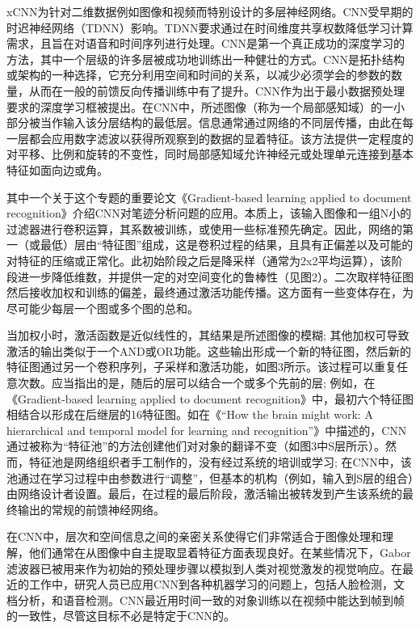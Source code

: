 xCNN为针对二维数据例如图像和视频而特别设计的多层神经网络。CNN受早期的时迟神经网络（TDNN）影响。TDNN要求通过在时间维度共享权数降低学习计算需求，且旨在对语音和时间序列进行处理。CNN是第一个真正成功的深度学习的方法，其中一个层级的许多层被成功地训练出一种健壮的方式。CNN是拓扑结构或架构的一种选择，它充分利用空间和时间的关系，以减少必须学会的参数的数量，从而在一般的前馈反向传播训练中有了提升。CNN作为出于最小数据预处理要求的深度学习框被提出。在CNN中，所述图像（称为一个局部感知域）的一小部分被当作输入该分层结构的最低层。信息通常通过网络的不同层传播，由此在每一层都会应用数字滤波以获得所观察到的数据的显着特征。该方法提供一定程度的对平移、比例和旋转的不变性，同时局部感知域允许神经元或处理单元连接到基本特征如面向边或角。

其中一个关于这个专题的重要论文《Gradient-based learning applied to document recognition》介绍CNN对笔迹分析问题的应用。本质上，该输入图像和一组N小的过滤器进行卷积运算，其系数被训练，或使用一些标准预先确定。因此，网络的第一（或最低）层由“特征图”组成，这是卷积过程的结果，且具有正偏差以及可能的对特征的压缩或正常化。此初始阶段之后是降采样（通常为2x2平均运算），该阶段进一步降低维数，并提供一定的对空间变化的鲁棒性（见图2）。二次取样特征图然后接收加权和训练的偏差，最终通过激活功能传播。这方面有一些变体存在，为尽可能少每层一个图或多个图的总和。

当加权小时，激活函数是近似线性的，其结果是所述图像的模糊; 其他加权可导致激活的输出类似于一个AND或OR功能。这些输出形成一个新的特征图，然后新的特征图通过另一个卷积序列，子采样和激活功能，如图3所示。该过程可以重复任意次数。应当指出的是，随后的层可以结合一个或多个先前的层; 例如，在《Gradient-based learning applied to document recognition》中，最初六个特征图相结合以形成在后继层的16特征图。如在《“How the brain might work: A hierarchical and temporal model for learning and recognition”》中描述的，CNN通过被称为“特征池”的方法创建他们对对象的翻译不变（如图3中S层所示）。然而，特征池是网络组织者手工制作的，没有经过系统的培训或学习; 在CNN中，该池通过在学习过程中由参数进行“调整”，但基本的机构（例如，输入到S层的组合）由网络设计者设置。最后，在过程的最后阶段，激活输出被转发到产生该系统的最终输出的常规的前馈神经网络。

在CNN中，层次和空间信息之间的亲密关系使得它们非常适合于图像处理和理解，他们通常在从图像中自主提取显着特征方面表现良好。在某些情况下，Gabor滤波器已被用来作为初始的预处理步骤以模拟到人类对视觉激发的视觉响应。在最近的工作中，研究人员已应用CNN到各种机器学习的问题上，包括人脸检测，文档分析，和语音检测。CNN最近用时间一致的对象训练以在视频中能达到帧到帧的一致性，尽管这目标不必是特定于CNN的。

